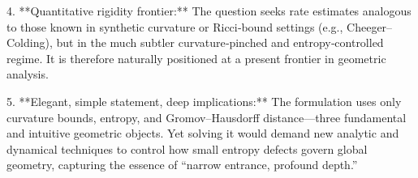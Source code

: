 4. **Quantitative rigidity frontier:**  
   The question seeks rate estimates analogous to those known in synthetic curvature or Ricci‑bound settings (e.g., Cheeger–Colding), but in the much subtler curvature‑pinched and entropy‑controlled regime. It is therefore naturally positioned at a present frontier in geometric analysis.

5. **Elegant, simple statement, deep implications:**  
   The formulation uses only curvature bounds, entropy, and Gromov–Hausdorff distance—three fundamental and intuitive geometric objects. Yet solving it would demand new analytic and dynamical techniques to control how small entropy defects govern global geometry, capturing the essence of “narrow entrance, profound depth.”
